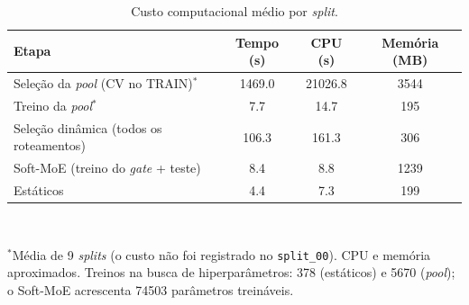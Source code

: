 \begin{table}[H]
\centering
\caption{Custo computacional médio por \textit{split}.}
\label{tab:custo-computacional}
\footnotesize
\begin{tabular}{lccc}
\toprule
\textbf{Etapa} & \textbf{Tempo (s)} & \textbf{CPU (s)} & \textbf{Memória (MB)} \\
\midrule
Seleção da \textit{pool} (CV no TRAIN)$^{*}$ & 1469.0 & 21026.8 & 3544 \\
Treino da \textit{pool}$^{*}$ & 7.7 & 14.7 & 195 \\
Seleção dinâmica (todos os roteamentos) & 106.3 & 161.3 & 306 \\
Soft-MoE (treino do \textit{gate} + teste) & 8.4 & 8.8 & 1239 \\
Estáticos & 4.4 & 7.3 & 199 \\
\bottomrule
\end{tabular}
\\[1ex]
\parbox{0.95\linewidth}{\scriptsize $^{*}$Média de 9 \textit{splits} (o custo não foi registrado no \texttt{split\_00}). CPU e memória aproximados. Treinos na busca de hiperparâmetros: 378 (estáticos) e 5670 (\textit{pool}); o Soft-MoE acrescenta 74503 parâmetros treináveis.}
\end{table}
